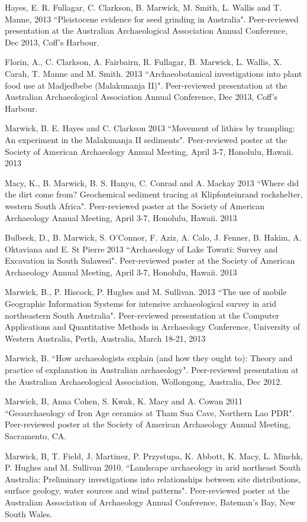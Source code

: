 \ind Hayes, E.  R. Fullagar, C. Clarkson, B. Marwick, M. Smith, L. Wallis and T. Manne, 2013 ``Pleistocene evidence for seed grinding in Australia". Peer-reviewed presentation at the Australian Archaeological Association Annual Conference, Dec 2013, Coff’s Harbour.

\ind Florin, A., C. Clarkson, A. Fairbairn, R. Fullagar, B. Marwick, L. Wallis, X. Carah, T. Manne and M. Smith. 2013 ``Archaeobotanical investigations into plant food use at Madjedbebe (Malakunanja II)". Peer-reviewed presentation at the Australian Archaeological Association Annual Conference, Dec 2013, Coff’s Harbour.

\ind Marwick, B. E. Hayes and C. Clarkson 2013 ``Movement of lithics by trampling: An experiment in the Malakunanja II sediments". Peer-reviewed poster at the Society of American Archaeology Annual Meeting, April 3-7, Honolulu, Hawaii. 2013

\ind Macy, K., B. Marwick, B. S. Hanyu, C. Conrad and A. Mackay 2013 ``Where did the dirt come from? Geochemical sediment tracing at Klipfonteinrand rockshelter, western South Africa". Peer-reviewed poster at the Society of American Archaeology Annual Meeting, April 3-7, Honolulu, Hawaii. 2013

\ind Bulbeck, D., B. Marwick, S. O'Connor, F. Aziz, A. Calo, J. Fenner, B. Hakim, A. Oktaviana and E. St Pierre 2013 ``Archaeology of Lake Towuti: Survey and Excavation in South Sulawesi". Peer-reviewed poster at the Society of American Archaeology Annual Meeting, April 3-7, Honolulu, Hawaii. 2013

\ind Marwick, B., P. Hiscock, P. Hughes and M. Sullivan. 2013 ``The use of mobile Geographic Information Systems for intensive archaeological survey in arid northeastern South Australia". Peer-reviewed presentation at the Computer Applications and Quantitative Methods in Archaeology Conference, University of Western Australia, Perth, Australia, March 18-21, 2013

\ind Marwick, B. ``How archaeologists explain (and how they ought to): Theory and practice of explanation in Australian archaeology". Peer-reviewed presentation at the Australian Archaeological Association, Wollongong, Australia, Dec 2012.

\ind Marwick, B, Anna Cohen, S. Kwak, K. Macy and A. Cowan 2011 ``Geoarchaeology of Iron Age ceramics at Tham Sua Cave, Northern Lao PDR". Peer-reviewed poster at the Society of American Archaeology Annual Meeting, Sacramento, CA.

\ind Marwick, B, T. Field, J. Martinez, P. Przystupa, K. Abbott, K. Macy, L. Minchk, P. Hughes and M. Sullivan 2010. ``Landscape archaeology in arid northeast South Australia: Preliminary investigations into relationships between site distributions, surface geology, water sources and wind patterns". Peer-reviewed poster at the Australian Association of Archaeology Annual Conference, Bateman’s Bay, New South Wales.


